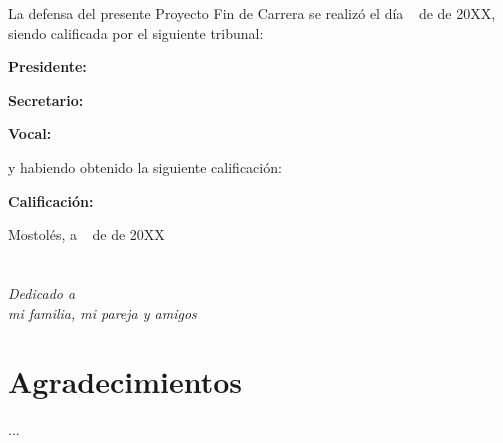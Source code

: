 \documentclass[a4paper, 12pt]{book}
\begin{document}
\vspace{1cm}
La defensa del presente Proyecto Fin de Carrera se realizó el día \qquad$\;\,$ de \qquad\qquad\qquad\qquad \newline de 20XX, siendo calificada por el siguiente tribunal:


\vspace{0.5cm}
\textbf{Presidente:}

\vspace{1.2cm}
\textbf{Secretario:}

\vspace{1.2cm}
\textbf{Vocal:}


\vspace{1.2cm}
y habiendo obtenido la siguiente calificación:

\vspace{1cm}
\textbf{Calificación:}


\vspace{1cm}
\begin{flushright}
Mostolés, a \qquad$\;\,$ de \qquad\qquad\qquad\qquad de 20XX
\end{flushright}


\chapter*{}
\begin{flushright}
\textit{Dedicado a \\
mi familia, mi pareja y amigos}
\end{flushright}


\chapter*{Agradecimientos}
...
\end{document}
